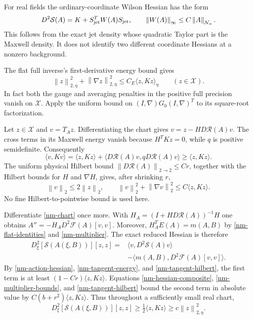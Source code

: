 \documentclass[11pt]{article}
\theoremstyle{remark}
\newcommand{\norm}[1]{\left\|#1\right\|}
\begin{document}
For real fields the ordinary-coordinate Wilson Hessian has the
form
\begin{equation}\label{nm-action-hessian}
 D^2\mathcal S(A)=K+S_{\rm jet}^TW(A)S_{\rm jet},
 \qquad \norm{W(A)}_\infty\le C\norm{A}_{\mathcal N_\alpha}.
\end{equation}
This follows from the exact jet density whose quadratic Taylor
part is the Maxwell density. It does not identify two different
coordinate Hessians at a nonzero background.

The flat full inverse's first-derivative energy bound gives
\begin{equation}\label{nm-coercivity}
 \norm{z}_{2,\eta}^2+\norm{\nabla z}_{2,\eta}^2
 \le C_E\langle z,Kz\rangle_\eta\qquad(z\in\mathcal X).
\end{equation}
In fact both the gauge and averaging penalties in the positive
full precision vanish on $\mathcal X$. Apply the uniform bound on
$(I,\nabla)G_0(I,\nabla)^T$ to its square-root factorization.

Let $z\in\mathcal X$ and $v=T_Az$. Differentiating the chart gives
$v=z-HD\mathcal R(A)v$. The cross terms in its Maxwell energy
vanish because $H^TKz=0$, while $q$ is positive semidefinite.
Consequently
\begin{equation}\label{nm-tangent-energy}
 \langle v,Kv\rangle
 =\langle z,Kz\rangle+
   \langle D\mathcal R(A)v,qD\mathcal R(A)v\rangle
 \ge\langle z,Kz\rangle.
\end{equation}
The uniform physical Hilbert bound $\norm{D\mathcal R(A)}_{2\to2}
\le Cr$, together with the Hilbert bounds for $H$ and $\nabla H$,
gives, after shrinking $r$,
\begin{equation}\label{nm-tangent-hilbert}
 \norm{v}_2\le2\norm{z}_2,\qquad
 \norm{v}_2^2+\norm{\nabla v}_2^2
 \le C\langle z,Kz\rangle.
\end{equation}
No fine Hilbert-to-pointwise bound is used here.

Differentiate \eqref{nm-chart} once more. With
$H_A=(I+HD\mathcal R(A))^{-1}H$ one obtains
$A''=-H_AD^2\mathcal F(A)[v,v]$. Moreover,
$H_A^TE(A)=m(A,B)$ by \eqref{nm-flat-identities} and
\eqref{nm-multiplier}. The exact reduced Hessian is therefore
\begin{equation}\label{nm-reduced-hessian}
 \begin{split}
 D_\xi^2[\mathcal S(A(\xi,B))][z,z]
 ={}&\langle v,D^2\mathcal S(A)v\rangle\\
 &-\langle m(A,B),D^2\mathcal F(A)[v,v]\rangle.
 \end{split}
\end{equation}
By \eqref{nm-action-hessian}, \eqref{nm-tangent-energy}, and
\eqref{nm-tangent-hilbert}, the first term is at least
$(1-Cr)\langle z,Kz\rangle$. Equations
\eqref{nm-hessian-composite}, \eqref{nm-multiplier-bounds}, and
\eqref{nm-tangent-hilbert} bound the second term in absolute value
by $C(b+r^2)\langle z,Kz\rangle$. Thus throughout a sufficiently
small real chart,
\begin{equation}\label{nm-strict-hessian}
 D_\xi^2[\mathcal S(A(\xi,B))][z,z]
 \ge\tfrac12\langle z,Kz\rangle
 \ge c\norm{z}_{2,\eta}^2.
\end{equation}
\end{document}
